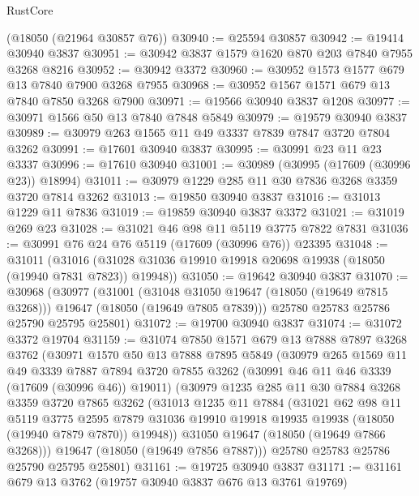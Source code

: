 \begin{lexlean}{RustCore}
\begin{coremodule}
    (@18050 (@21964 @30857 @76))
@30940 := @25594 @30857
@30942 := @19414 @30940 @3837
@30951 := @30942 @3837 @1579 @1620 @870 @203 @7840 @7955 @3268 @8216
@30952 := @30942 @3372
@30960 := @30952 @1573 @1577 @679 @13 @7840 @7900 @3268 @7955
@30968 := @30952 @1567 @1571 @679 @13 @7840 @7850 @3268 @7900
@30971 := @19566 @30940 @3837 @1208
@30977 := @30971 @1566 @50 @13 @7840 @7848 @5849
@30979 := @19579 @30940 @3837
@30989 := @30979 @263 @1565 @11 @49 @3337 @7839 @7847 @3720 @7804 @3262
@30991 := @17601 @30940 @3837
@30995 := @30991 @23 @11 @23 @3337
@30996 := @17610 @30940
@31001 := @30989 (@30995 (@17609 (@30996 @23)) @18994)
@31011 := @30979 @1229 @285 @11 @30 @7836 @3268 @3359 @3720 @7814 @3262
@31013 := @19850 @30940 @3837
@31016 := @31013 @1229 @11 @7836
@31019 := @19859 @30940 @3837 @3372
@31021 := @31019 @269 @23
@31028 := @31021 @46 @98 @11 @5119 @3775 @7822 @7831
@31036 := @30991 @76 @24 @76 @5119 (@17609 (@30996 @76)) @23395
@31048 := @31011
    (@31016 (@31028 @31036 @19910 @19918 @20698 @19938 (@18050 (@19940 @7831 @7823)) @19948))
@31050 := @19642 @30940 @3837
@31070 := @30968
    (@30977
      (@31001
        (@31048 @31050 @19647 (@18050 (@19649 @7815 @3268)))
        @19647
        (@18050 (@19649 @7805 @7839)))
      @25780
      @25783
      @25786
      @25790
      @25795
      @25801)
@31072 := @19700 @30940 @3837
@31074 := @31072 @3372 @19704
@31159 := @31074
    @7850
    @1571
    @679
    @13
    @7888
    @7897
    @3268
    @3762
    (@30971
      @1570
      @50
      @13
      @7888
      @7895
      @5849
      (@30979
        @265
        @1569
        @11
        @49
        @3339
        @7887
        @7894
        @3720
        @7855
        @3262
        (@30991 @46 @11 @46 @3339 (@17609 (@30996 @46)) @19011)
        (@30979
          @1235
          @285
          @11
          @30
          @7884
          @3268
          @3359
          @3720
          @7865
          @3262
          (@31013
            @1235
            @11
            @7884
            (@31021
              @62
              @98
              @11
              @5119
              @3775
              @2595
              @7879
              @31036
              @19910
              @19918
              @19935
              @19938
              (@18050 (@19940 @7879 @7870))
              @19948))
          @31050
          @19647
          (@18050 (@19649 @7866 @3268)))
        @19647
        (@18050 (@19649 @7856 @7887)))
      @25780
      @25783
      @25786
      @25790
      @25795
      @25801)
@31161 := @19725 @30940 @3837
@31171 := @31161 @679 @13 @3762 (@19757 @30940 @3837 @676 @13 @3761 @19769)

\end{coremodule}
\end{lexlean}
